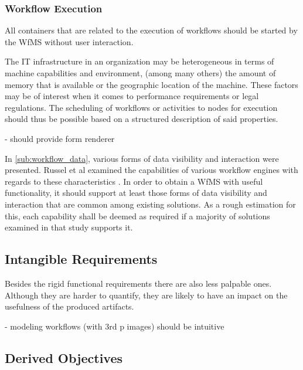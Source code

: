 
  \subsubsection{Workflow Execution} %
    \label{ssub:workflow_execution}

        All containers that are related to the execution of workflows should be started by the \ac{WfMS} without user interaction.

        The IT infrastructure in an organization may be heterogeneous in terms of machine capabilities and environment, \eg (among many others) the amount of memory that is available or the geographic location of the machine. These factors may be of interest when it comes to performance requirements or legal regulations. The scheduling of workflows or activities to nodes for execution should thus be possible based on a structured description of said properties.

        - should provide form renderer

        In \ref{sub:workflow_data}, various forms of data visibility and interaction were presented. Russel et al examined the capabilities of various workflow engines with regards to these characteristics \cite{Russell2005Workflow}. In order to obtain a \ac{WfMS} with useful functionality, it should support at least those forms of data visibility and interaction that are common among existing solutions. As a rough estimation for this, each capability shall be deemed as required if a majority of solutions examined in that study supports it.


\subsection{Intangible Requirements} %
  \label{sub:intangible_requirements}

  Besides the rigid functional requirements there are also less palpable ones. Although they are harder to quantify, they are likely to have an impact on the usefulness of the produced artifacts.

    - modeling workflows (with 3rd p images) should be intuitive


\subsection{Derived Objectives} %
  \label{sub:derived_objectives}

